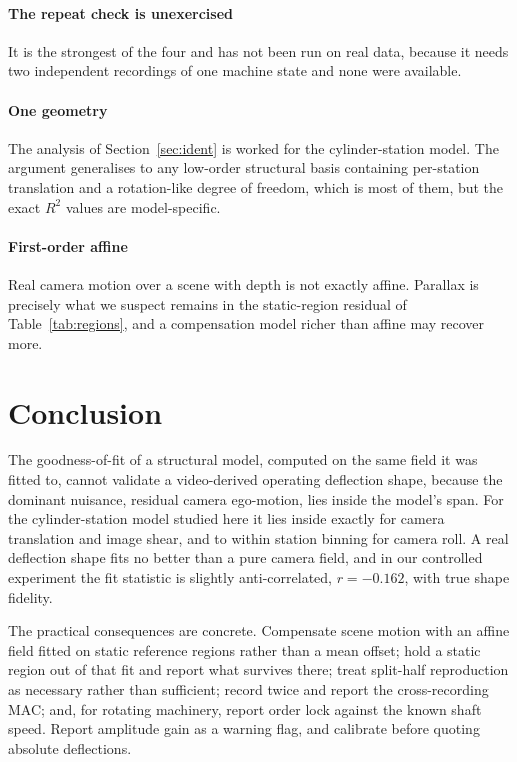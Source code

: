 \documentclass[preprint,12pt]{elsarticle}
\begin{document}
\paragraph{The repeat check is unexercised}
It is the strongest of the four and has not been run on real data, because
it needs two independent recordings of one machine state and none were
available.

\paragraph{One geometry}
The analysis of Section~\ref{sec:ident} is worked for the cylinder-station
model. The argument generalises to any low-order structural basis containing
per-station translation and a rotation-like degree of freedom, which is most
of them, but the exact $R^2$ values are model-specific.

\paragraph{First-order affine}
Real camera motion over a scene with depth is not exactly affine. Parallax
is precisely what we suspect remains in the static-region residual of
Table~\ref{tab:regions}, and a compensation model richer than affine may
recover more.

\section{Conclusion}
\label{sec:conclusion}

The goodness-of-fit of a structural model, computed on the same field it was
fitted to, cannot validate a video-derived operating deflection shape,
because the dominant nuisance, residual camera ego-motion, lies inside the
model's span. For the cylinder-station model studied here it lies inside
exactly for camera translation and image shear, and to within station
binning for camera roll. A real deflection shape fits no better than a pure
camera field, and in our controlled experiment the fit statistic is slightly
anti-correlated, $r = -0.162$, with true shape fidelity.

The practical consequences are concrete. Compensate scene motion with an
affine field fitted on static reference regions rather than a mean offset;
hold a static region out of that fit and report what survives there; treat
split-half reproduction as necessary rather than sufficient; record twice
and report the cross-recording MAC; and, for rotating machinery, report
order lock against the known shaft speed. Report amplitude gain as a warning
flag, and calibrate before quoting absolute deflections.
\end{document}
